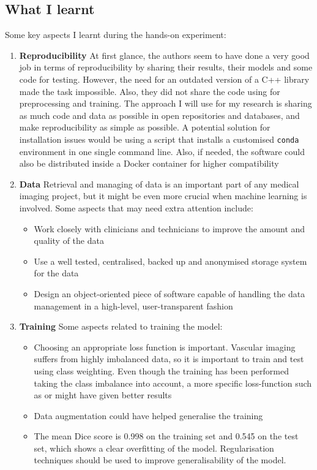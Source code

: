 \subsection{What I learnt}

Some key aspects I learnt during the hands-on experiment:
\begin{enumerate}
  \item \textbf{Reproducibility} At first glance, the authors seem to have done a very good job in terms of reproducibility by sharing their results, their models and some code for testing. However, the need for an outdated version of a C++ library made the task impossible. Also, they did not share the code using for preprocessing and training. The approach I will use for my research is sharing as much code and data as possible in open repositories and databases, and make reproducibility as simple as possible. A potential solution for installation issues would be using a script that installs a customised \texttt{conda} \cite{noauthor_conda_nodate} environment in one single command line. Also, if needed, the software could also be distributed inside a Docker container \cite{noauthor_docker_nodate} for higher compatibility

  \item \textbf{Data} Retrieval and managing of data is an important part of any medical imaging project, but it might be even more crucial when machine learning is involved. Some aspects that may need extra attention include:
    \begin{itemize}
      \item Work closely with clinicians and technicians to improve the amount and quality of the data
      \item Use a well tested, centralised, backed up and anonymised storage system for the data
      \item Design an object-oriented piece of software capable of handling the data management in a high-level, user-transparent fashion
    \end{itemize}

  \item \textbf{Training} Some aspects related to training the model:
    \begin{itemize}
      \item Choosing an appropriate loss function is important. Vascular imaging suffers from highly imbalanced data, so it is important to train and test using class weighting. Even though the training has been performed taking the class imbalance into account, a more specific loss-function such as \cite{sudre_generalised_2017} or \cite{fidon_generalised_2018} might have given better results
      \item Data augmentation could have helped generalise the training
      \item The mean Dice score is 0.998 on the training set and 0.545 on the test set, which shows a clear overfitting of the model. Regularisation techniques should be used to improve generalisability of the model.
    \end{itemize}
\end{enumerate}


